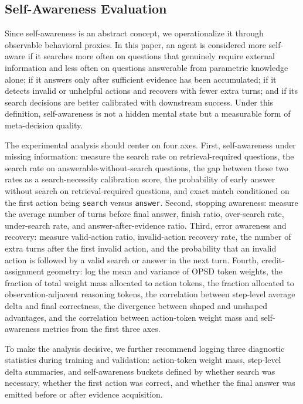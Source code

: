 \documentclass[11pt]{article}
\begin{document}
\subsection{Self-Awareness Evaluation}
Since self-awareness is an abstract concept, we operationalize it through observable behavioral proxies. In this paper, an agent is considered more self-aware if it searches more often on questions that genuinely require external information and less often on questions answerable from parametric knowledge alone; if it answers only after sufficient evidence has been accumulated; if it detects invalid or unhelpful actions and recovers with fewer extra turns; and if its search decisions are better calibrated with downstream success. Under this definition, self-awareness is not a hidden mental state but a measurable form of meta-decision quality.

The experimental analysis should center on four axes. First, self-awareness under missing information: measure the search rate on retrieval-required questions, the search rate on answerable-without-search questions, the gap between these two rates as a search-necessity calibration score, the probability of early answer without search on retrieval-required questions, and exact match conditioned on the first action being \texttt{search} versus \texttt{answer}. Second, stopping awareness: measure the average number of turns before final answer, finish ratio, over-search rate, under-search rate, and answer-after-evidence ratio. Third, error awareness and recovery: measure valid-action ratio, invalid-action recovery rate, the number of extra turns after the first invalid action, and the probability that an invalid action is followed by a valid search or answer in the next turn. Fourth, credit-assignment geometry: log the mean and variance of OPSD token weights, the fraction of total weight mass allocated to action tokens, the fraction allocated to observation-adjacent reasoning tokens, the correlation between step-level average delta and final correctness, the divergence between shaped and unshaped advantages, and the correlation between action-token weight mass and self-awareness metrics from the first three axes.

To make the analysis decisive, we further recommend logging three diagnostic statistics during training and validation: action-token weight mass, step-level delta summaries, and self-awareness buckets defined by whether search was necessary, whether the first action was correct, and whether the final answer was emitted before or after evidence acquisition.
\end{document}
